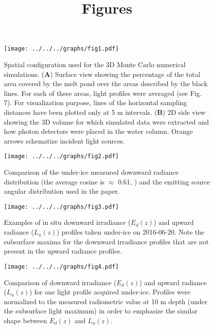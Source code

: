 \documentclass[12pt,a4paper]{scrartcl}
\title{Figures}
\date{}
\newcommand{\edz}{\ensuremath{{E_d(z)}}}
\newcommand{\luz}{\ensuremath{{L_u(z)}}}
\begin{document}
\maketitle

\begin{figure}[ht]
	\centering
	\texttt{[image: ../../../graphs/fig1.pdf]}
	\caption{Spatial configuration used for the 3D Monte Carlo numerical simulations. (\textbf{A}) Surface view showing the percentage of the total area covered by the melt pond over the areas described by the black lines. For each of these areas, light profiles were averaged (see Fig. 7). For visualization purpose, lines of the horizontal sampling distances have been plotted only at 5 m intervals. (\textbf{B}) 2D side view showing the 3D volume for which simulated data were extracted and how photon detectors were placed in the water column. Orange arrows schematize incident light sources.}
\end{figure}

\clearpage
\newpage

\begin{figure}[h]
	\centering
	\texttt{[image: ../../../graphs/fig2.pdf]}
	\caption{Comparison of the under-ice measured downward radiance distribution (the average cosine is $\approx$ 0.61, \cite{Girard2018}) and the emitting source angular distribution used in the paper.}
\end{figure}

\clearpage
\newpage

\begin{figure}[ht]
	\centering
	\texttt{[image: ../../../graphs/fig3.pdf]}
	\caption{Examples of in situ downward irradiance (\edz{}) and upward radiance (\luz{}) profiles taken under-ice on 2016-06-20. Note the subsurface maxima for the downward irradiance profiles that are not present in the upward radiance profiles.}
\end{figure}

\clearpage
\newpage

\begin{figure}[ht]
	\centering
	\texttt{[image: ../../../graphs/fig4.pdf]}
	\caption{Comparison of downward irradiance (\edz{}) and upward radiance (\luz{}) for one light profile acquired under-ice. Profiles were normalized to the measured radiometric value at 10 m depth (under the subsurface light maximum) in order to emphasize the similar shape between \edz{} and \luz{}.}
\end{figure}
\end{document}
